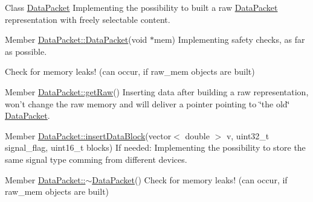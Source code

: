\label{todo__todo000001}
\hypertarget{todo__todo000001}{}
 
\begin{DoxyDescription}
\item[Class \hyperlink{class_data_packet}{DataPacket} ]Implementing the possibility to built a raw \hyperlink{class_data_packet}{DataPacket} representation with freely selectable content. 
\end{DoxyDescription}

\label{todo__todo000002}
\hypertarget{todo__todo000002}{}
 
\begin{DoxyDescription}
\item[Member \hyperlink{class_data_packet_abcb0afec0bf5e6c21175f25d7911b1d7}{DataPacket::DataPacket}(void $\ast$mem) ]Implementing safety checks, as far as possible.



Check for memory leaks! (can occur, if raw\_\-mem objects are built) 
\end{DoxyDescription}

\label{todo__todo000006}
\hypertarget{todo__todo000006}{}
 
\begin{DoxyDescription}
\item[Member \hyperlink{class_data_packet_a6d05054482f9844487d5253a1b903a1e}{DataPacket::getRaw}() ]Inserting data after building a raw representation, won't change the raw memory and will deliver a pointer pointing to \char`\"{}the old\char`\"{} \hyperlink{class_data_packet}{DataPacket}. 
\end{DoxyDescription}

\label{todo__todo000005}
\hypertarget{todo__todo000005}{}
 
\begin{DoxyDescription}
\item[Member \hyperlink{class_data_packet_ab83c192471bb4d70cd21653adcc7da7f}{DataPacket::insertDataBlock}(vector$<$ double $>$ v, uint32\_\-t signal\_\-flag, uint16\_\-t blocks) ]If needed: Implementing the possibility to store the same signal type comming from different devices. 
\end{DoxyDescription}

\label{todo__todo000003}
\hypertarget{todo__todo000003}{}
 
\begin{DoxyDescription}
\item[Member \hyperlink{class_data_packet_a6865aaea072c8af4caf7e4cb6baa0155}{DataPacket::$\sim$DataPacket}() ]Check for memory leaks! (can occur, if raw\_\-mem objects are built)


\end{DoxyDescription}

